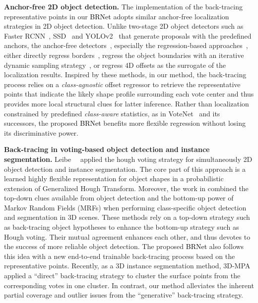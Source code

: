 \documentclass[final]{cvpr}
\newcommand{\method}{\textcolor{black}{BRNet }}
\begin{document}
\vspace{+1mm}
\noindent\textbf{Anchor-free 2D object detection.}
The implementation of the back-tracing representative points in our \method adopts similar anchor-free localization strategies in 2D object detection.
Unlike two-stage 2D object detectors such as Faster RCNN~\cite{faster-rcnn}, SSD~\cite{ssd} and YOLOv2~\cite{yolov2} that generate proposals with the predefined anchors, the anchor-free detectors~\cite{cornernet,tychsen2017denet,zhou2019bottom,fcos,reppoints,redmon2016you,duan2019centernet}, especially the regression-based approaches~\cite{fcos,reppoints,kong2020foveabox,redmon2016you,duan2019centernet}, either directly regress borders~\cite{redmon2016you}, regress the object boundaries with an iterative dynamic sampling strategy~\cite{reppoints}, or regress 4D offsets as the surrogate of the localization results\cite{fcos}.
Inspired by these methods, in our method, the back-tracing process relies on a \emph{class-agnostic} offset regressor to retrieve the representative points that indicate the likely shape profile surrounding each vote center and thus provides more local structural clues for latter inference.
Rather than localization constrained by predefined \emph{class-aware} statistics, as in VoteNet~\cite{votenet} and its successors, the proposed \method benefits more flexible regression without losing its discriminative power.

\vspace{+1mm}
\noindent\textbf{Back-tracing in voting-based object detection and instance segmentation.}
Leibe~\etal~\cite{robust-hough} applied the hough voting strategy for simultaneously 2D object detection and instance segmentation.
The core part of this approach is a learned highly flexible representation for object shapes in a probabilistic extension of Generalized Hough Transform.
Moreover, the work in \cite{scene-cut} combined the top-down clues available from object detection and the bottom-up power of Markov Random Fields (MRFs) when performing class-specific object detection and segmentation in 3D scenes.
These methods rely on a top-down strategy such as back-tracing object hypotheses to enhance the bottom-up strategy such as Hough voting.
Their mutual agreement enhances each other, and thus devotes to the success of more reliable object detection.
The proposed \method also follows this idea with a new end-to-end trainable back-tracing process based on the representative points. 
Recently, as a 3D instance segmentation method, 3D-MPA~\cite{3d-mpa} applied a ``direct'' back-tracing strategy to cluster the surface points from the corresponding votes in one cluster.
In contrast, our method alleviates the inherent partial coverage and outlier issues from the ``generative'' back-tracing strategy.
\end{document}
